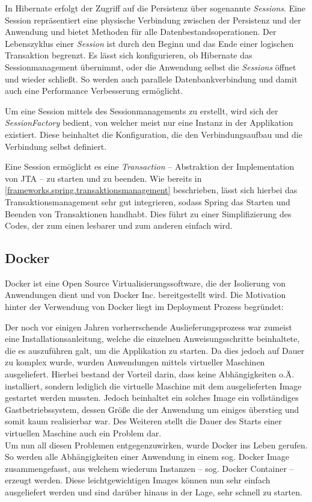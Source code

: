 				In Hibernate erfolgt der Zugriff auf die Persistenz über sogenannte \textit{Sessions}. Eine Session repräsentiert eine physische Verbindung zwischen der Persistenz und der Anwendung und bietet Methoden für alle Datenbestandsoperationen. Der Lebenszyklus einer \textit{Session} ist durch den Beginn und das Ende einer logischen Transaktion begrenzt. Es lässt sich konfigurieren, ob Hibernate das Sessionmanagement übernimmt, oder die Anwendung selbst die \textit{Sessions} öffnet und wieder schließt. So werden auch parallele Datenbankverbindung und damit auch eine Performance Verbesserung ermöglicht.
				
				Um eine Session mittels des Sessionmanagements zu erstellt, wird sich der \textit{SessionFactory} bedient, von welcher meist nur eine Instanz in der Applikation existiert. Diese beinhaltet die Konfiguration, die den Verbindungsaufbau und die Verbindung selbst definiert.
				
				Eine Session ermöglicht es eine \textit{Transaction} -- Abstraktion der Implementation von \ac{JTA} -- zu starten und zu beenden. Wie bereits in \autoref{frameworks.spring.transaktionsmanagement} beschrieben, lässt sich hierbei das Transaktionsmanagement sehr gut integrieren, sodass Spring das Starten und Beenden von Transaktionen handhabt. Dies führt zu einer Simplifizierung des Codes, der zum einen lesbarer und zum anderen einfach wird. 
				
		\subsection{Docker} %
			
			Docker ist eine Open Source Virtualisierungssoftware, die der Isolierung von Anwendungen dient und von Docker Inc. bereitgestellt wird. Die Motivation hinter der Verwendung von Docker liegt im Deployment Prozess begründet: 
			
			Der noch vor einigen Jahren vorherrschende Auslieferungsprozess war zumeist eine Installationsanleitung, welche die einzelnen Anweisungsschritte beinhaltete, die es auszuführen galt, um die Applikation zu starten. Da dies jedoch auf Dauer zu komplex wurde, wurden Anwendungen mittels virtueller Maschinen ausgeliefert. Hierbei bestand der Vorteil darin, dass keine Abhängigkeiten o.Ä. installiert, sondern lediglich die virtuelle Maschine mit dem ausgelieferten Image gestartet werden mussten. Jedoch beinhaltet ein solches Image ein vollständiges Gastbetriebssystem, dessen Größe die der Anwendung um einiges überstieg und somit kaum realisierbar war. Des Weiteren stellt die Dauer des Starts einer virtuellen Maschine auch ein Problem dar. \\
			Um nun all diesen Problemen entgegenzuwirken, wurde Docker ins Leben gerufen. So werden alle Abhängigkeiten einer Anwendung in einem sog. Docker Image zusammengefasst, aus welchem wiederum Instanzen -- sog. Docker Container -- erzeugt werden. Diese leichtgewichtigen Images können nun sehr einfach ausgeliefert werden und sind darüber hinaus in der Lage, sehr schnell zu starten. \cite{ThomasClaudiusHuber.2019}
			
